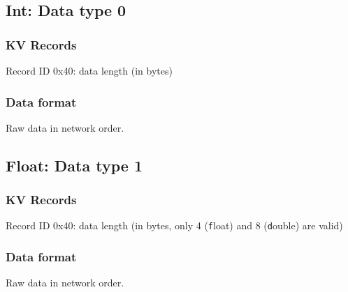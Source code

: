 \documentclass[border=10pt,png]{article}
\begin{document}
\subsection{Int: Data type 0}
\subsubsection{KV Records}
Record ID 0x40: data length (in bytes)
\subsubsection{Data format}
Raw data in network order.

\subsection{Float: Data type 1}
\subsubsection{KV Records}
Record ID 0x40: data length (in bytes, only 4 ({\texttt float}) and 8 ({\texttt double}) are valid)
\subsubsection{Data format}
Raw data in network order.
\end{document}
